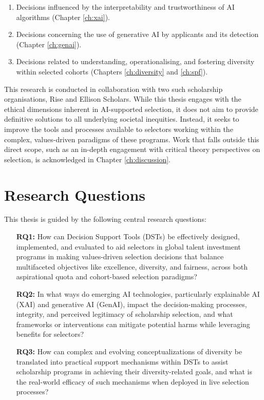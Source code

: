 \begin{enumerate}
    \item Decisions influenced by the interpretability and trustworthiness of AI algorithms (Chapter \ref{ch:xai}).
    \item Decisions concerning the use of generative AI by applicants and its detection (Chapter \ref{ch:genai}).
    \item Decisions related to understanding, operationalising, and fostering diversity within selected cohorts (Chapters \ref{ch:diversity} and \ref{ch:spf}).
\end{enumerate}

This research is conducted in collaboration with two such scholarship organisations, Rise and Ellison Scholars. While this thesis engages with the ethical dimensions inherent in AI-supported selection, it does not aim to provide definitive solutions to all underlying societal inequities. Instead, it seeks to improve the tools and processes available to selectors working within the complex, values-driven paradigms of these programs. Work that falls outside this direct scope, such as an in-depth engagement with critical theory perspectives on selection, is acknowledged in Chapter \ref{ch:discussion}.

\section{Research Questions}

This thesis is guided by the following central research questions:

\begin{enumerate}
    \item[\textbf{RQ1:}] How can Decision Support Tools (DSTs) be effectively designed, implemented, and evaluated to aid selectors in global talent investment programs in making values-driven selection decisions that balance multifaceted objectives like excellence, diversity, and fairness, across both aspirational quota and cohort-based selection paradigms?
    \item[\textbf{RQ2:}] In what ways do emerging AI technologies, particularly explainable AI (XAI) and generative AI (GenAI), impact the decision-making processes, integrity, and perceived legitimacy of scholarship selection, and what frameworks or interventions can mitigate potential harms while leveraging benefits for selectors?
    \item[\textbf{RQ3:}] How can complex and evolving conceptualizations of diversity be translated into practical support mechanisms within DSTs to assist scholarship programs in achieving their diversity-related goals, and what is the real-world efficacy of such mechanisms when deployed in live selection processes?
\end{enumerate}

